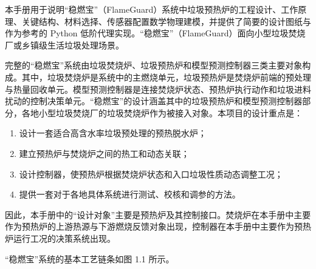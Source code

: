 \documentclass[UTF8,openany,zihao=-4,oneside]{ctexbook}
\providecommand{\tightlist}{\setlength{\itemsep}{0pt}\setlength{\parskip}{0pt}}
\begin{document}
本手册用于说明``稳燃宝''（FlameGuard）系统中垃圾预热炉的工程设计、工作原理、关键结构、材料选择、传感器配置数学物理建模，并提供了简要的设计图纸与作为参考的 Python 低阶代理实现。``稳燃宝''（FlameGuard）面向小型垃圾焚烧厂或乡镇级生活垃圾处理场景。

完整的``稳燃宝''系统由垃圾焚烧炉、垃圾预热炉和模型预测控制器三类主要对象构成。其中，垃圾焚烧炉是系统中的主燃烧单元，垃圾预热炉是焚烧炉前端的预处理与热量回收单元。模型预测控制器是连接焚烧炉状态、预热炉执行动作和垃圾进料扰动的控制决策单元。``稳燃宝''的设计涵盖其中的垃圾预热炉和模型预测控制器部分，各地小型垃圾焚烧厂的垃圾焚烧炉作为被接入对象。本项目的设计重点是：

\begin{enumerate}
\def\labelenumi{\arabic{enumi}.}
\tightlist
\item
  设计一套适合高含水率垃圾预处理的预热脱水炉；
\item
  建立预热炉与焚烧炉之间的热工和动态关联；
\item
  设计控制器，使预热炉根据焚烧炉状态和入口垃圾性质动态调整工况；
\item
  提供一套对于各地具体系统进行测试、校核和调参的方法。
\end{enumerate}

因此，本手册中的``设计对象''主要是预热炉及其控制接口。焚烧炉在本手册中主要作为预热炉的上游热源与下游燃烧反馈对象出现，控制器在本手册中主要作为预热炉运行工况的决策系统出现。

``稳燃宝''系统的基本工艺链条如图 1.1 所示。
\end{document}
